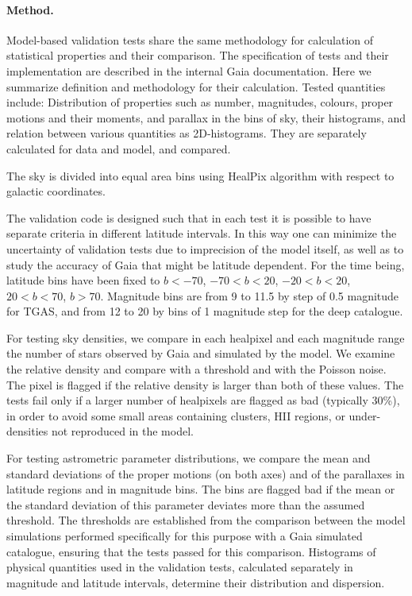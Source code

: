 \paragraph{Method.} \label{sec:method943}

Model-based validation tests share the same methodology for calculation of statistical properties and 
their comparison. The specification of tests and their implementation are described in the internal Gaia documentation.
Here we summarize definition and methodology for their calculation. Tested quantities include: 
Distribution of properties such as number, magnitudes, colours, proper motions and their moments, 
and parallax in the bins of sky, their histograms, and relation between various quantities as 
2D-histograms. They are separately calculated for data and model, and compared.

The sky is divided into equal area bins using HealPix algorithm with respect to 
galactic coordinates.

The validation code is designed such that in each test it is possible to have separate 
criteria in different latitude intervals. In this way one can minimize the uncertainty of 
validation tests due to imprecision of the model itself, as well as to study the accuracy of Gaia that might be latitude dependent. For the time being, latitude bins have been fixed to $b<-70$\deg, $-70<b<20$, $-20<b<20$, $20<b<70$, $b>70$\deg. Magnitude bins are from 9 to 11.5 by step of 0.5 magnitude for TGAS, and from 12 to 20 by bins of 1 magnitude step for the deep catalogue.

For testing sky densities, we compare in each healpixel and each magnitude range the number of stars observed by Gaia and simulated by the model. We examine the relative density and compare with a threshold and with the Poisson noise. The pixel is flagged if the relative density is larger than both of these values. The tests fail only if a larger number of healpixels are flagged as bad (typically 30\%), in order to avoid some small areas containing clusters, HII regions, or under-densities not reproduced in the model.

For testing astrometric parameter distributions, we compare the mean and standard deviations of the proper motions (on both axes) and of the parallaxes in latitude regions and in magnitude bins. The bins are flagged bad if the mean or the standard deviation of this parameter deviates more than the assumed threshold. The thresholds are established from the comparison between the model simulations performed specifically for this purpose \citep{2014A&A...564A.102C} with a Gaia simulated catalogue, ensuring that the tests passed for this comparison. Histograms of physical quantities used in the validation tests, calculated separately in magnitude and latitude intervals, determine their distribution and dispersion. 

